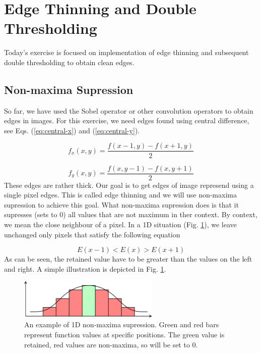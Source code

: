 \documentclass[12pt]{article}
\begin{document}
\section*{Edge Thinning and Double Thresholding}

Today's exercise is focused on implementation of edge thinning and subsequent double thresholding to obtain clean edges.

\subsection*{Non-maxima Supression}

So far, we have used the Sobel operator or other convolution operators to obtain edges in images.
For this exercise, we need edges found using central difference, see Eqs. (\ref{eq:central-x}) and (\ref{eq:central-y}).

\begin{equation} \label{eq:central-x}
    f_x(x, y) = \frac{f(x - 1, y) - f(x + 1, y)}{2}
\end{equation}

\begin{equation} \label{eq:central-y}
    f_y(x, y) = \frac{f(x, y - 1) - f(x, y + 1)}{2}
\end{equation}
These edges are rather thick.
Our goal is to get edges of image represend using a single pixel edges.
This is called edge thinning and we will use non-maxima supression to achieve this goal.
What non-maxima supression does is that it supresses (sets to $0$) all values that are not maximum in ther context.
By context, we mean the close neighbour of a pixel.
In a 1D situation (Fig. \ref{fig:non-maxima-supression-1d}), we leave unchanged only pixels that satisfy the following equation

\begin{equation} \label{eq:max_1d}
    E(x - 1) < E(x) > E(x + 1)
\end{equation}
As can be seen, the retained value have to be greater than the values on the left and right.
A simple illustration is depicted in Fig. \ref{fig:non-maxima-supression-1d}.

\begin{figure}[h]
\begin{centering}
    \includegraphics[width=0.6\textwidth]{non_maxima_supression_1d}
    \caption{An example of 1D non-maxima supression. Green and red bars represent function values at specific positions. The green value is retained, red values are non-maxima, so will be set to 0.}
    \label{fig:non-maxima-supression-1d}
\end{centering}
\end{figure}
\end{document}
